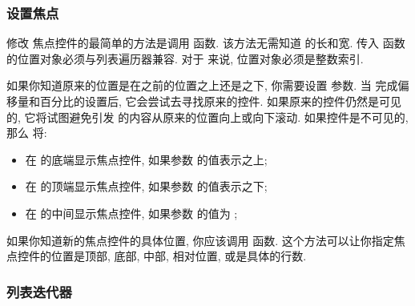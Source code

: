 \subsubsection{设置焦点}
修改  焦点控件的最简单的方法是调用  函数. 该方法无需知道  的长和宽. 传入  函数的位置对象必须与列表遍历器兼容. 对于  来说, 位置对象必须是整数索引.

\indent 如果你知道原来的位置是在之前的位置之上还是之下, 你需要设置  参数. 当  完成偏移量和百分比的设置后, 它会尝试去寻找原来的控件. 如果原来的控件仍然是可见的, 它将试图避免引发  的内容从原来的位置向上或向下滚动. 如果控件是不可见的, 那么  将:%
%
\begin{itemize}
  \item 在  的底端显示焦点控件, 如果参数  的值表示之上;
  \item 在  的顶端显示焦点控件, 如果参数  的值表示之下;
  \item 在  的中间显示焦点控件, 如果参数  的值为 ;
\end{itemize}%
%
如果你知道新的焦点控件的具体位置, 你应该调用  函数. 这个方法可以让你指定焦点控件的位置是顶部, 底部, 中部, 相对位置, 或是具体的行数.


\subsubsection{列表迭代器}